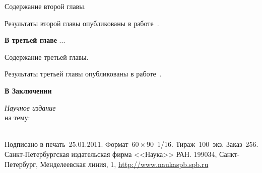 \documentclass[%
autoref,     %
href,        %
colorlinks,  %
facsimile,   %
]{disser}
\begin{document}
Содержание второй главы.

Результаты второй главы опубликованы в работе~\cite{Petrov_2001_Journal_23_12321}.

\textbf{В третьей главе} ...

Содержание третьей главы.

Результаты третьей главы опубликованы в работе~\cite{Sidorov_2002_Journal_32_1531}.

\textbf{В Заключении}

\printbibliography[keyword=own,title={Основные публикации по теме диссертации}]
\printbibliography[notkeyword=own,title={Цитированная литература}]

\clearpage
\thispagestyle{empty}
\normalfont\selectfont
\vspace*{2cm}
\begin{center}
\textit{Научное издание}\\
\vskip 2cm
\makeatletter
\@author
\vskip 1.5cm
\@title{} на тему:\\
\@topic\\
\makeatother
\end{center}
\vfill
Подписано в печать~25.01.2011.
Формат~$60 \times 90$~1/16.
Тираж~100~экз.
Заказ~256.\\[2ex]
\noindent
Санкт-Петербургская издательская фирма <<Наука>> РАН.
199034, Санкт-Петербург, Менделеевская линия, 1,
\href{http://www.naukaspb.spb.ru}{http://www.naukaspb.spb.ru}
\end{document}
